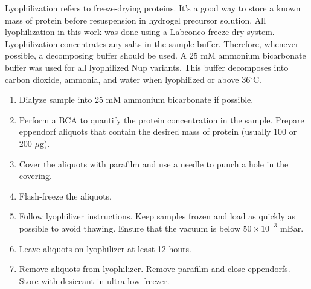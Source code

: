 Lyophilization refers to freeze-drying proteins.  It's a good way to store a known mass of protein before resuspension in hydrogel precursor solution.  All lyophilization in this work was done using a Labconco freeze dry system.  Lyophilization concentrates any salts in the sample buffer.  Therefore, whenever possible, a decomposing buffer should be used.  A 25 mM ammonium bicarbonate buffer was used for all lyophilized Nup variants.  This buffer decomposes into carbon dioxide, ammonia, and water when lyophilized or above 36$^\circ$C.

\begin{enumerate}
\item Dialyze sample into 25 mM ammonium bicarbonate if possible.
\item Perform a BCA to quantify the protein concentration in the sample.  Prepare eppendorf aliquots that contain the desired mass of protein (usually 100 or 200 $\mu$g).
\item Cover the aliquots with parafilm and use a needle to punch a hole in the covering.
\item Flash-freeze the aliquots.
\item Follow lyophilizer instructions.  Keep samples frozen and load as quickly as possible to avoid thawing.  Ensure that the vacuum is below $50 \times 10^{-3}$ mBar.
\item Leave aliquots on lyophilizer at least 12 hours.
\item Remove aliquots from lyophilizer. Remove parafilm and close eppendorfs. Store with desiccant in ultra-low freezer.
\end{enumerate}


